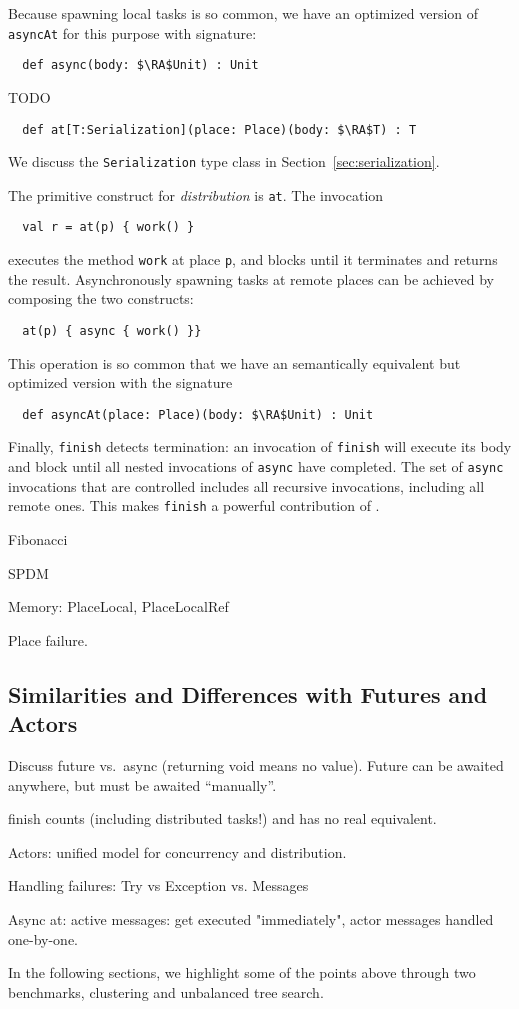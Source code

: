 Because spawning local tasks is so common, we have an optimized version of \lstinline{asyncAt} for this purpose with signature:
\begin{lstlisting}
  def async(body: $\RA$Unit) : Unit
\end{lstlisting}  

TODO

\begin{lstlisting}
  def at[T:Serialization](place: Place)(body: $\RA$T) : T
\end{lstlisting}
We discuss the \lstinline{Serialization} type class in
Section~\ref{sec:serialization}.


The primitive construct for \emph{distribution} is \lstinline{at}. The invocation
\begin{lstlisting}
  val r = at(p) { work() }
\end{lstlisting}
executes the method \lstinline{work} at place \lstinline{p}, and blocks until
it terminates and returns the result. Asynchronously spawning tasks at remote places can be achieved by composing the two constructs:
\begin{lstlisting}
  at(p) { async { work() }}
\end{lstlisting}
This operation is so common that we have an semantically equivalent but optimized version with the signature
\begin{lstlisting}
  def asyncAt(place: Place)(body: $\RA$Unit) : Unit
\end{lstlisting}

Finally, \lstinline{finish} detects termination: an invocation of
\lstinline{finish} will execute its body and block until all nested invocations
of \lstinline{async} have completed. The set of \lstinline{async} invocations
that are controlled includes all recursive invocations, including all remote
ones. This makes \lstinline{finish} a powerful contribution of \apgas.

Fibonacci

SPDM

Memory: PlaceLocal, PlaceLocalRef

Place failure.

\subsection{Similarities and Differences with Futures and Actors}

Discuss future vs.\ async (returning void means no value). Future can be awaited anywhere, but must be awaited ``manually''.

finish counts (including distributed tasks!) and has no real equivalent.

Actors: unified model for concurrency and distribution.

Handling failures: Try vs Exception vs. Messages

Async at: active messages: get executed "immediately", actor messages handled one-by-one.

In the following sections, we highlight some of the points above through two
benchmarks, \kmeans clustering and unbalanced tree search.


% 
